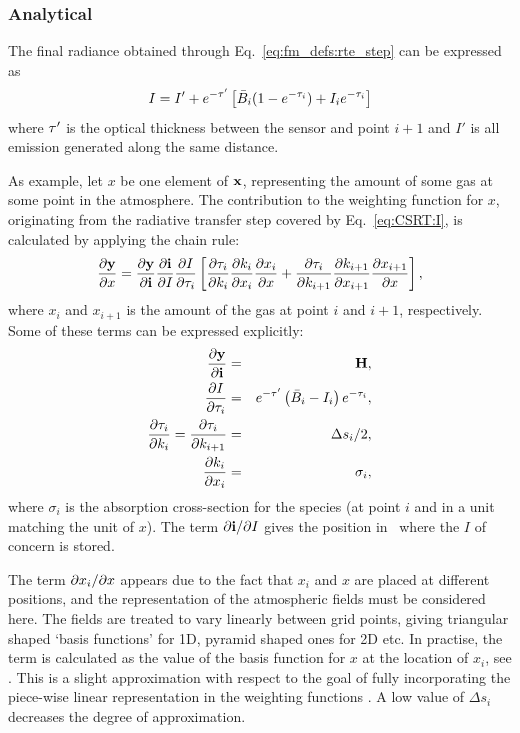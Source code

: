 \subsubsection{Analytical}

The final radiance obtained through Eq.~\ref{eq:fm_defs:rte_step} can be
expressed as
\begin{equation}
  \label{eq:I4J}
  I = I'+ e^{-\tau'}\left[ \bar{B}_i(1-e^{-\tau_{i}})+I_ie^{-\tau_{i}}\right]
\end{equation}
where $\tau'$ is the optical thickness between the sensor and point $i+1$
and $I'$ is all emission generated along the same distance.

As example, let $x$ be one element of $\mathbf{x}$, representing the amount of
some gas at some point in the atmosphere. The contribution to the weighting
function for $x$, originating from the radiative transfer step covered by
Eq.~\ref{eq:CSRT:I}, is calculated by applying the chain rule:
\begin{equation}
  \label{eq:chainrule}
  \frac{\partial \mathbf{y}}{\partial x} =  
  \frac{\partial \mathbf{y}}{\partial \mathbf{i}}
  \frac{\partial \mathbf{i}}{\partial I} \frac{\partial I}{\partial \tau_{i}}
  \left[\frac{\partial \tau_{i}}{\partial k_i}\frac{\partial k_i}{\partial x_i} 
        \frac{\partial x_i}{\partial x} +
        \frac{\partial \tau_{i}}{\partial k_{i+1}}\frac{\partial k_{i+1}}{\partial x_{i+1}}
        \frac{\partial x_{i+1}}{\partial x} \right],
\end{equation}
where $x_i$ and $x_{i+1}$ is the amount of the gas at point $i$ and $i+1$,
respectively. Some of these terms can be expressed explicitly:
\begin{eqnarray}
  \frac{\partial \mathbf{y}}{\partial \mathbf{i}} &=& \mathbf{H}, \\
  \frac{\partial I}{\partial \tau_{i}} 
      &=& e^{-\tau'}\left( \bar{B}_i-I_i\right)e^{-\tau_{i}}, \\
  \frac{\partial \tau_{i}}{\partial k_i}=\frac{\partial \tau_{i}}{\partial k_{i+1}} 
      &=& \Delta s_i/2, \\
  \frac{\partial k_i}{\partial x_i}
      &=& \sigma_i, \\
\end{eqnarray}
where $\sigma_i$ is the absorption cross-section for the species (at point $i$
and in a unit matching the unit of $x$). The term $\partial \mathbf{i}/\partial I$
gives the position in \MpiVct\ where the $I$ of concern is stored.

The term $\partial x_i/\partial x$ appears due to the fact that $x_i$ and $x$ are
placed at different positions, and the representation of the atmospheric fields
must be considered here. The fields are treated to vary linearly between grid
points, giving triangular shaped `basis functions' for 1D, pyramid shaped ones
for 2D etc. In practise, the term is calculated as the value of the basis
function for $x$ at the location of $x_i$, see \cite{buehler:artst:05}. This is
a slight approximation with respect to the goal of fully incorporating the
piece-wise linear representation in the weighting functions
\cite{buehler:artst:05}. A low value of $\Delta s_i$ decreases the degree of
approximation.

